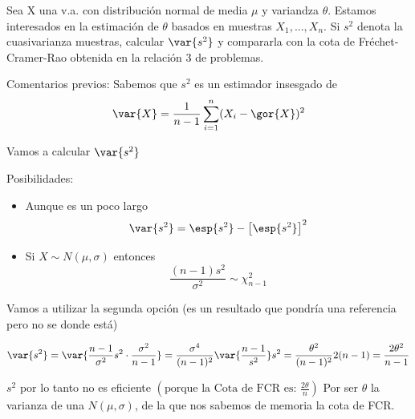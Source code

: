 \begin{problem}[9]
Sea X una v.a. con distribución normal de media $\mu$ y variandza $\theta$. Estamos interesados en la estimación de $\theta$ basados en muestras $X_1,...,X_n$. Si $s^2$ denota la cuasivarianza muestras, calcular $\var{s^2}$ y compararla con la cota de Fréchet-Cramer-Rao obtenida en la relación 3 de problemas.
\solution

Comentarios previos: Sabemos que $s^2$ es un estimador insesgado de \[\var{X} = \frac{1}{n-1} \sum_{i=1}^n (X_i - \gor{X})^2\]

Vamos a calcular $\var{s^2}$

Posibilidades:
\begin{itemize}
\item Aunque es un poco largo\[
\var{s^2} = \esp{s^2}-\left[\esp{s^2}\right]^2
\]

\item Si $X\sim N(\mu,\sigma)$ entonces \[\frac{(n-1)s^2}{\sigma^2} \sim \chi_{n-1}^2\]
\end{itemize}

Vamos a utilizar la segunda opción (es un resultado que pondría una referencia pero no se donde está)

\[
\var{s^2} = \var{\frac{n-1}{\sigma^2}s^2\cdot\frac{\sigma^2}{n-1}} = \frac{\sigma^4}{(n-1)^2} \var{\frac{n-1}{s^2}} s^2 = \frac{\theta^2}{(n-1)^2}2(n-1) = \frac{2\theta^2}{n-1} \]

$s^2$ por lo tanto no es eficiente $\left( \text{porque la Cota de FCR es: } \displaystyle\frac{2\theta}{n}\right)$ Por ser $\theta$ la varianza de una $N(\mu,\sigma)$, de la que nos sabemos de memoria la cota de FCR.


\end{problem}